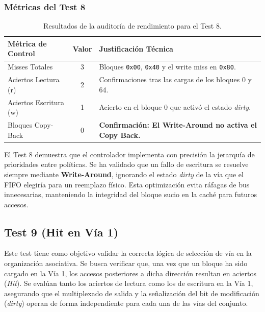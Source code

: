 \documentclass[12pt,a4paper]{article}
\begin{document}
\subsubsection{Métricas del Test 8}

\begin{table}[H]
\centering
\small
\renewcommand{\arraystretch}{1.2}
\begin{tabular}{|l|c|l|}
\hline
\rowcolor[HTML]{EFEFEF} 
\textbf{Métrica de Control} & \textbf{Valor} & \textbf{Justificación Técnica} \\ \hline
Misses Totales & 3 & Bloques \texttt{0x00}, \texttt{0x40} y el write miss en \texttt{0x80}. \\ \hline
Aciertos Lectura (r) & 2 & Confirmaciones tras las cargas de los bloques 0 y 64. \\ \hline
Aciertos Escritura (w) & 1 & Acierto en el bloque 0 que activó el estado \textit{dirty}. \\ \hline
Bloques Copy-Back & 0 & \textbf{Confirmación: El Write-Around no activa el Copy Back.} \\ \hline
\end{tabular}
\caption{Resultados de la auditoría de rendimiento para el Test 8.}
\label{tab:audit_test8}
\end{table}

El Test 8 demuestra que el controlador implementa con precisión la jerarquía de prioridades entre políticas. Se ha validado que un fallo de escritura se resuelve siempre mediante \textbf{Write-Around}, ignorando el estado \textit{dirty} de la vía que el FIFO elegiría para un reemplazo físico. Esta optimización evita ráfagas de bus innecesarias, manteniendo la integridad del bloque sucio en la caché para futuros accesos.

\subsection{Test 9 (Hit en Vía 1)}

Este test tiene como objetivo validar la correcta lógica de selección de vía en la organización asociativa. Se busca verificar que, una vez que un bloque ha sido cargado en la Vía 1, los accesos posteriores a dicha dirección resultan en aciertos (\textit{Hit}). Se evalúan tanto los aciertos de lectura como los de escritura en la Vía 1, asegurando que el multiplexado de salida y la señalización del bit de modificación (\textit{dirty}) operan de forma independiente para cada una de las vías del conjunto.
\end{document}
